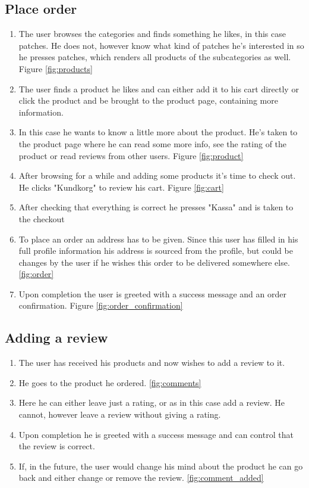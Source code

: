\documentclass[paper=a4, fontsize=11pt]{report} %
\begin{document}
	\subsection*{Place order}
	\begin{enumerate}
		\item The user browses the categories and finds something he likes, in this case patches. He does not, however know what kind of patches he's interested in so he presses patches, which renders all products of the subcategories as well. Figure \ref{fig:products}
		\item The user finds a product he likes and can either add it to his cart directly or click the product and be brought to the product page, containing more information.
		\item In this case he wants to know a little more about the product. He's taken to the product page where he can read some more info, see the rating of the product or read reviews from other users. Figure \ref{fig:product}
		\item After browsing for a while and adding some products it's time to check out. He clicks "Kundkorg" to review his cart. Figure \ref{fig:cart}
		\item After checking that everything is correct he presses "Kassa" and is taken to the checkout
		\item To place an order an address has to be given. Since this user has filled in his full profile information his address is sourced from the profile, but could be changes by the user if he wishes this order to be delivered somewhere else. \ref{fig:order}
		\item Upon completion the user is greeted with a success message and an order confirmation. Figure \ref{fig:order_confirmation}
	\end{enumerate}


	\subsection*{Adding a review}
	\begin{enumerate}
		\item The user has received his products and now wishes to add a review to it.
		\item He goes to the product he ordered. \ref{fig:comments}
		\item Here he can either leave just a rating, or as in this case add a review. He cannot, however leave a review without giving a rating.
		\item Upon completion he is greeted with a success message and can control that the review is correct.
		\item If, in the future, the user would change his mind about the product he can go back and either change or remove the review. \ref{fig:comment_added}
	\end{enumerate}
\end{document}
